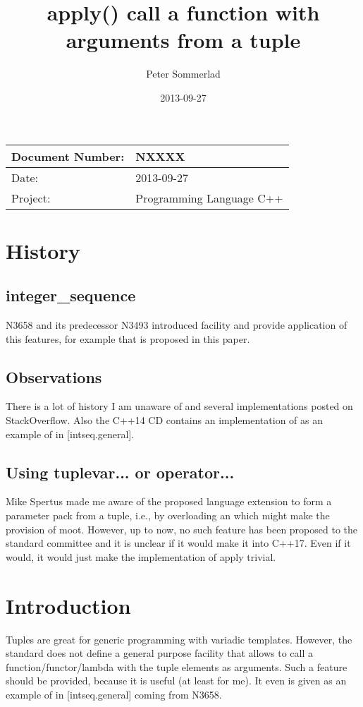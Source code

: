 \documentclass[ebook,11pt,article]{memoir}
\title{apply() call a function with arguments from a tuple
}
\author{Peter Sommerlad}
\date{2013-09-27}                                           %
\begin{document}
\maketitle
\begin{tabular}[t]{|l|l|}\hline 
Document Number: &  NXXXX \\\hline
Date: & 2013-09-27 \\\hline
Project: & Programming Language C++\\\hline 
\end{tabular}
\chapter{History}
\section{integer_sequence}
N3658 and its predecessor N3493 introduced  facility and provide application of this features, for example  that is proposed in this paper.
\section{Observations}
There is a lot of history I am unaware of and several implementations posted on StackOverflow. Also the C++14 CD contains an implementation of  as an example of  in [intseq.general].
\section{Using tuplevar... or operator...}
Mike Spertus made me aware of the proposed language extension to form a parameter pack from a tuple, i.e., by overloading an  which might make the provision of  moot. However, up to now, no such feature has been proposed to the standard committee and it is unclear if it would make it into C++17. Even if it would, it would just make the implementation of apply trivial.
\chapter{Introduction}
Tuples are great for generic programming with variadic templates. However, the standard does not define a general purpose facility that allows to call a function/functor/lambda with the tuple elements as arguments. Such a feature should be provided, because it is useful (at least for me). It even is given as an example of  in [intseq.general] coming from N3658. 
\end{document}
